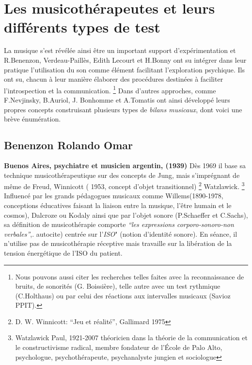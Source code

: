   
\section{Les musicothérapeutes et leurs différents types de test}
\label{musicothEtpsycho}

	 La musique s'est révélée ainsi être un important support
         d'expérimentation et 
	 R.Benenzon,  Verdeau-Paillès, Edith
         Lecourt et H.Bonny ont su intégrer dans leur pratique l'utilisation du son comme
         élément facilitant l'exploration psychique.
         Ils ont su, chacun à leur manière  élaborer des procédures destinées à faciliter
         l'introspection et la communication.
\footnote{Nous pouvons aussi citer les recherches telles faites avec la reconnaissance de
bruits, de sonorités (G. Boissière), telle autre avec un test rythmique
(C.Holthaus) ou par celui
des réactions aux intervalles musicaux (Savioz PPIT).} 
Dans d'autres approches, comme F.Nevjinsky, B.Auriol, J. Bonhomme
           et A.Tomatis ont ainsi développé leurs propres
           concepts construisant plusieurs types de \emph{bilans musicaux},
           dont voici une brève énumération.
           

          

         

  \subsection{Benenzon Rolando Omar} 
	\textbf{ Buenos Aires, psychiatre et
    musicien argentin, (1939)}
	  \label{benenzon}
	  Dès 1969 il base sa technique 
	  musicothérapeutique sur des concepts 
	  de Jung, mais s'imprégnant de même de Freud, Winnicott (
          1953, concept d'objet transitionnel) \footnote{
          D. W. Winnicott: ``Jeu et réalité'', Gallimard 1975 }
          Watzlawick. \footnote{ Watzlawick Paul, 1921-2007  théoricien dans la théorie de la communication et le constructivisme radical, membre fondateur de l'École de Palo Alto, psychologue, psychothérapeute, psychanalyste jungien et sociologue} 
	  Influencé par les grands  pédagogues musicaux comme
          Willems(1890-1978, conceptions éducatives faisant la liaison
          entre la musique, l'être humain et le cosmos),
          Dalcroze ou Kodaly ainsi que par l'objet sonore (P.Schaeffer
          et C.Sachs), sa définition de musicothérapie comporte  
	  \emph{\textsl{ ``les expressions corporo-sonoro-non
              verbales''}},\autocite{benenzon:musicotherapie}.
 autocite)
	  centrée sur l'\textit{ISO}" (notion
          d'identité sonore). En séance, il n'utilise pas de
          musicothérapie réceptive mais travaille sur la libération de
          la tension énergétique de l'ISO du patient.

